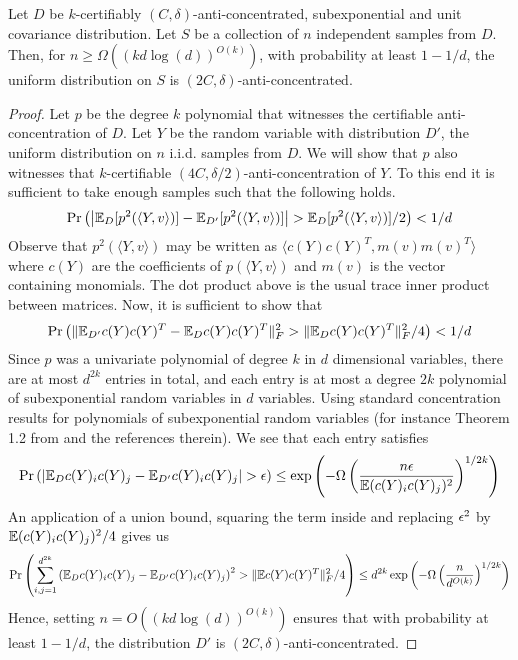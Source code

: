 \begin{lemma} \label{lem:sampling-preserves-certified-anti-concentrated}
Let $D$ be $k$-certifiably $(C,\delta)$-anti-concentrated, subexponential and unit covariance distribution. Let $S$ be a collection of $n$ independent samples from $D$. Then, for $n \geq \Omega \left( (kd\log(d))^{O(k)} \right)$, with probability at least $1-1/d$, the uniform distribution on $S$ is $(2C,\delta)$-anti-concentrated. 
\end{lemma}
\begin{proof} 
Let $p$ be the degree $k$ polynomial that witnesses the certifiable anti-concentration of $D$. 
Let $Y$ be the random variable with distribution $D'$, the uniform distribution on $n$ i.i.d. samples from $D$.
We will show that $p$ also witnesses that $k$-certifiable $(4C,\delta/2)$-anti-concentration of $Y$. To this end it is sufficient to take enough samples such that the following holds. 
\[ \Pr\left( \left| \mathbb{E}_{D} [p^2(\langle Y, v\rangle)] - \mathbb{E}_{D'} [p^2(\langle Y, v\rangle)] \right| > \mathbb{E}_{D} [p^2(\langle Y, v\rangle)]/2 \right) < 1/d \] 
Observe that $p^2(\langle Y, v\rangle)$ may be written as $\langle c(Y)c(Y)^T, m(v)m(v)^T\rangle$ where $c(Y)$ are the coefficients of $p(\langle Y, v\rangle)$ and $m(v)$ is the vector containing monomials. The dot product above is the usual trace inner product between matrices. Now, it is sufficient to show that 
\[ \Pr\left( \| \mathbb{E}_{D'} c(Y)c(Y)^T - \mathbb{E}_{D} c(Y)c(Y)^T \|_F^2 > \|\mathbb{E}_{D} c(Y)c(Y)^T\|_F^2/4 \right) < 1/d \] 
Since $p$ was a univariate polynomial of degree $k$ in $d$ dimensional variables, there are at most $d^{2k}$ entries in total, and each entry is at most a degree $2k$ polynomial of subexponential random variables in $d$ variables. Using standard concentration results for polynomials of subexponential random variables (for instance Theorem 1.2 from \cite{PolyConc} and the references therein). We see that  each entry satisfies 
\[ \Pr \left( \left| \mathbb{E}_D c(Y)_i c(Y)_j - \mathbb{E}_{D'} c(Y)_i c(Y)_j \right| > \epsilon \right) \leq \exp\left(- \Omega\left(\frac{n \epsilon}{\mathbb{E}(c(Y)_i c(Y)_j)^2}\right)^{1/2k}\right) \] 
An application of a union bound, squaring the term inside and replacing $\epsilon^2$ by $\mathbb{E}(c(Y)_i c(Y)_j)^2/4$ gives us 
\[ \Pr \left( \sum_{i,j = 1}^{d^{2k}} \left( \mathbb{E}_D c(Y)_i c(Y)_j - \mathbb{E}_{D'} c(Y)_i c(Y)_j \right)^2 > \| \mathbb{E} c(Y) c(Y)^T \|^2_F/4  \right) \leq d^{2k} \exp\left(- \Omega\left(\frac{n}{d^{O(k)}}\right)^{1/2k}\right) \] 
Hence, setting $n = O((k d \log(d))^{O(k)})$ ensures that with probability at least $1-1/d$, the distribution $D'$ is $(2C, \delta)$-anti-concentrated.  


\end{proof}




